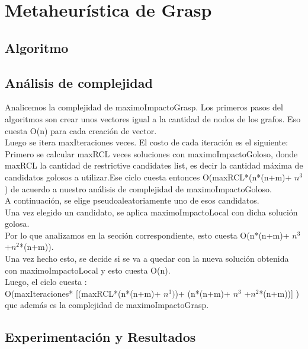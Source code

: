 \section{Metaheurística de Grasp}

\subsection{Algoritmo}

\subsection{Análisis de complejidad}

\indent Analicemos la complejidad de maximoImpactoGrasp. Los primeros pasos del algoritmos son crear unos vectores igual a la cantidad de nodos de los grafos. Eso cuesta O(n) para cada creación de vector.\\
\indent Luego se itera maxIteraciones veces. El costo de cada iteración es el siguiente:\\
\indent Primero se calcular maxRCL veces soluciones con maximoImpactoGoloso, donde maxRCL la cantidad de restrictive candidates list, es decir la cantidad máxima de candidatos golosos a utilizar.Ese ciclo cuesta entonces O(maxRCL*(n*(n+m)+ $n^{3}$) de acuerdo a nuestro análisis de complejidad de maximoImpactoGoloso.\\
\indent A continuación, se elige pseudoaleatoriamente uno de esos candidatos.\\
\indent Una vez elegido un candidato, se aplica maximoImpactoLocal con dicha solución golosa.\\ Por lo que analizamos en la sección correspondiente, esto cuesta O(n*(n+m)+ $n^{3}$ +$ n^{2}$*(n+m)).\\
\indent Una vez hecho esto, se decide si se va a quedar con la nueva solución obtenida con maximoImpactoLocal y esto cuesta O(n).\\
\indent Luego, el ciclo cuesta :\\

O(maxIteraciones* [(maxRCL*(n*(n+m)+ $n^{3})$)+ (n*(n+m)+ $n^{3}$ +$ n^{2}$*(n+m))] )\\

 que además es la complejidad de maximoImpactoGrasp.\\


\subsection{Experimentación y Resultados}
